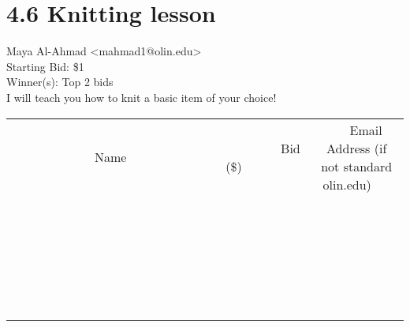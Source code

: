 \documentclass[11pt]{article}
\begin{document}
					\section*{4.6 Knitting lesson}
					Maya Al-Ahmad <mahmad1@olin.edu> \\
					Starting Bid: \$1 \\
					Winner(s): Top 2 bids \\
					I will teach you how to knit a basic item of your choice! \\
					[6ex]
					\begin{tabular}{c c c}
						~~~~~~~~~~~~~Name~~~~~~~~~~~~~ & ~~~~~~~~~Bid (\$)~~~~~~~~~ & ~~~Email Address (if not standard olin.edu)~~~ \\
				
 & & \\
\hline
 & & \\
\hline
 & & \\
\hline
 & & \\
\hline
 & & \\
\hline
 & & \\
\hline
 & & \\
\hline
 & & \\
\hline
 & & \\
\hline
 & & \\
\hline
 & & \\
\hline
 & & \\
\hline
 & & \\
\hline
 & & \\
\hline
 & & \\
\hline
 & & \\
\hline
 & & \\
\hline
 & & \\
\hline
 & & \\
\hline
 & & \\
\hline
 & & \\
\hline
 & & \\
\hline
 & & \\
\hline
 & & \\
\hline
 & & \\
\hline
 & & \\
\hline
					\end{tabular}
					\clearpage
				
\end{document}
